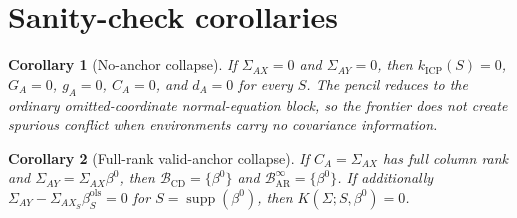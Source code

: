\documentclass[11pt]{article}
\theoremstyle{definition}
\theoremstyle{plain}
\newtheorem{corollary}{Corollary}
\theoremstyle{remark}
\begin{document}
\section{Sanity-check corollaries}
\begin{corollary}[No-anchor collapse]
If $\Sigma_{AX}=0$ and $\Sigma_{AY}=0$, then $k_{\mathrm{ICP}}(S)=0$, $G_A=0$, $g_A=0$, $C_A=0$, and $d_A=0$ for every $S$. The pencil reduces to the ordinary omitted-coordinate normal-equation block, so the frontier does not create spurious conflict when environments carry no covariance information.
\end{corollary}

\begin{corollary}[Full-rank valid-anchor collapse]
If $C_A=\Sigma_{AX}$ has full column rank and $\Sigma_{AY}=\Sigma_{AX}\beta^0$, then $\mathcal B_{\mathrm{CD}}=\{\beta^0\}$ and $\mathcal B_{\mathrm{AR}}^\infty=\{\beta^0\}$. If additionally $\Sigma_{AY}-\Sigma_{AX_S}\beta_S^{\mathrm{ols}}=0$ for $S=\operatorname{supp}(\beta^0)$, then $K(\Sigma;S,\beta^0)=0$.
\end{corollary}
\end{document}
